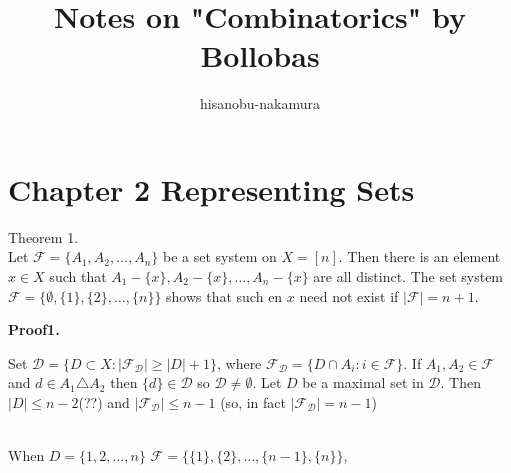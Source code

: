 \documentclass{article}
\author{hisanobu-nakamura}
\date{}
\title{Notes on "Combinatorics" by Bollobas}
\begin{document}
\maketitle
\tableofcontents


\section{Chapter 2 Representing Sets}
\label{sec:orgfeafa1d}
Theorem 1.\\
Let \(\mathcal{F}= \{A_1, A_2, \dots, A_n\}\) be a set system on \(X = [n]\).
Then there is an element \(x \in X\) such that \(A_1 - \{x\}, A_2 - \{x\}, \dots, A_n - \{x\}\) are all distinct.
The set system \(\mathcal{F}= \{\emptyset, \{1\}, \{2\}, \dots, \{n\}\}\) shows that such en \(x\) need not exist if \(|\mathcal{F}| = n +1\).

\textbf{Proof1.}

Set \(\mathcal{D} = \{D \subset X: |\mathcal{F_{D}}| \ge |D| + 1\}\), where \(\mathcal{F_{D}} = \{D \cap A_{i}: i \in \mathcal{F}\}\).
If \(A_{1}, A_{2} \in \mathcal{F}\) and \(d \in A_{1} \triangle A_{2}\) then \(\{d\} \in \mathcal{D}\) so \(\mathcal{D} \ne \emptyset\).
Let \(D\) be a maximal set in \(\mathcal{D}\). Then \(|D| \le n-2\)(??) and \(|\mathcal{F_{D}}| \le n-1\) (so, in fact \(|\mathcal{F_{D}}| = n-1\))

\\

When \(D=\{1, 2, \dots, n\}\) \(\mathcal{F} = \{\{1\},\{2\},\dots,\{n-1\},\{n\}\}\),
\end{document}
